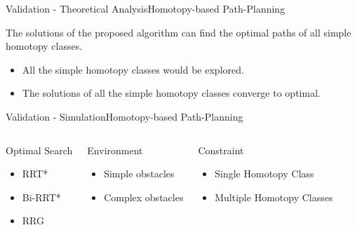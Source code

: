 \begin{frame}{Validation - Theoretical Analysis}{Homotopy-based Path-Planning}

\begin{thm}
The solutions of the proposed algorithm can find the optimal paths of all simple homotopy classes\footnotemark.
\end{thm}

\begin{itemize}
\item All the simple homotopy classes would be explored.
\item The solutions of all the simple homotopy classes converge to optimal.
\end{itemize}



\end{frame}

\begin{frame}{Validation - Simulation}{Homotopy-based Path-Planning}

\begin{columns}[t]

\begin{block}{Optimal Search}
\begin{itemize}
\item RRT*
\item Bi-RRT*
\item RRG 
\end{itemize}
\end{block}

\begin{block}{Environment}
\begin{itemize}
\item Simple obstacles
\item Complex obstacles
\end{itemize}
\end{block}

\begin{block}{Constraint}
\begin{itemize}
\item Single Homotopy Class
\item Multiple Homotopy Classes
\end{itemize}
\end{block}

\end{columns}

\end{frame}